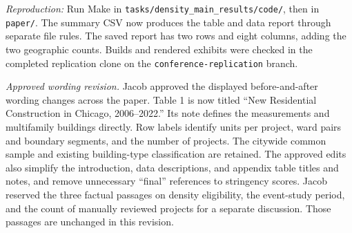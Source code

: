 \smallskip
\noindent\textit{Reproduction:} Run Make in
\texttt{tasks/density\_main\_results/code/}, then in \texttt{paper/}.
The summary CSV now produces the table and data report through separate file
rules. The saved report has two rows and eight columns, adding the two geographic
counts. Builds and rendered exhibits were checked in the completed replication
clone on the \texttt{conference-replication} branch.

\smallskip
\noindent\textit{Approved wording revision.} Jacob approved the displayed
before-and-after wording changes across the paper. Table 1 is now titled
``New Residential Construction in Chicago, 2006--2022.'' Its note defines the
measurements and multifamily buildings directly. Row labels identify units per
project, ward pairs and boundary segments, and the number of projects. The
citywide common sample and existing building-type classification are retained.
The approved edits also simplify the introduction, data descriptions, and
appendix table titles and notes, and remove unnecessary ``final'' references
to stringency scores. Jacob reserved the three factual passages on density
eligibility, the event-study period, and the count of manually reviewed projects
for a separate discussion. Those passages are unchanged in this revision.
